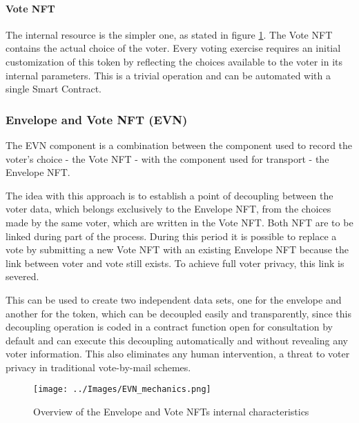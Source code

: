         \paragraph{Vote NFT}
        The internal resource is the simpler one, as stated in figure \ref{fig:evn_mechanics}. The Vote NFT contains the actual choice of the voter. Every voting exercise requires an initial customization of this token by reflecting the choices available to the voter in its internal parameters. This is a trivial operation and can be automated with a single Smart Contract.
        
        \subsubsection{Envelope and Vote NFT (EVN)}
        The EVN component is a combination between the component used to record the voter's choice - the Vote NFT - with the component used for transport - the Envelope NFT.
        \par
        The idea with this approach is to establish a point of decoupling between the voter data, which belongs exclusively to the Envelope NFT, from the choices made by the same voter, which are written in the Vote NFT. Both NFT are to be linked during part of the process. During this period it is possible to replace a vote by submitting a new Vote NFT with an existing Envelope NFT because the link between voter and vote still exists. To achieve full voter privacy, this link is severed.
        \par
        This can be used to create two independent data sets, one for the envelope and another for the token, which can be decoupled easily and transparently, since this decoupling operation is coded in a contract function open for consultation by default and can execute this decoupling automatically and without revealing any voter information. This also eliminates any human intervention, a threat to voter privacy in traditional vote-by-mail schemes.

        \begin{figure}[htp]
            \centering
            \texttt{[image: ../Images/EVN\_mechanics.png]}
            \caption{Overview of the Envelope and Vote NFTs internal characteristics}
            \label{fig:evn_mechanics}
        \end{figure}


